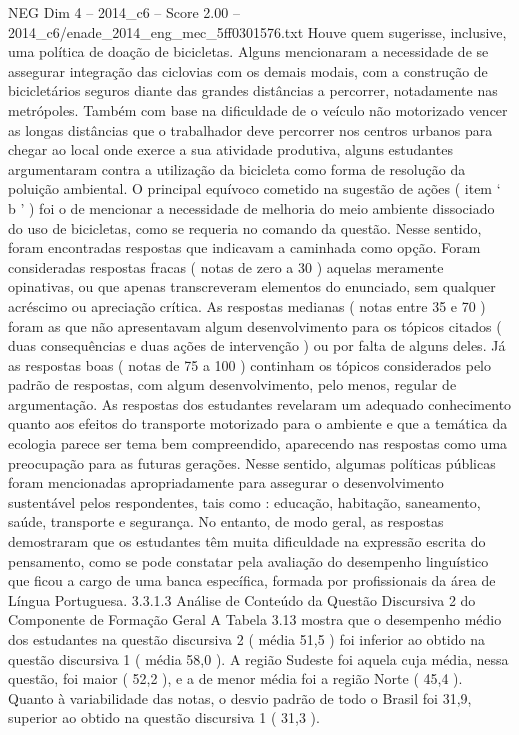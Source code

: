 \begin{textsample}{NEG Dim 4 – 2014\_c6 – Score 2.00 – 2014\_c6/enade\_2014\_eng\_mec\_5ff0301576.txt}
Houve quem sugerisse, inclusive, uma política de doação de bicicletas.
Alguns mencionaram a necessidade de se assegurar integração das ciclovias com os demais modais, com a construção de bicicletários seguros diante das grandes distâncias a percorrer, notadamente nas metrópoles.
Também com base na dificuldade de o veículo não motorizado vencer as longas distâncias que o trabalhador deve percorrer nos centros urbanos para chegar ao local onde exerce a sua atividade produtiva, alguns estudantes argumentaram contra a utilização da bicicleta como forma de resolução da poluição ambiental.
O principal equívoco cometido na sugestão de ações ( item ‘ b ’ ) foi o de mencionar a necessidade de melhoria do meio ambiente dissociado do uso de bicicletas, como se requeria no comando da questão.
Nesse sentido, foram encontradas respostas que indicavam a caminhada como opção.
Foram consideradas respostas fracas ( notas de zero a 30 ) aquelas meramente opinativas, ou que apenas transcreveram elementos do enunciado, sem qualquer acréscimo ou apreciação crítica.
As respostas medianas ( notas entre 35 e 70 ) foram as que não apresentavam algum desenvolvimento para os tópicos citados ( duas consequências e duas ações de intervenção ) ou por falta de alguns deles.
Já as respostas boas ( notas de 75 a 100 ) continham os tópicos considerados pelo padrão de respostas, com algum desenvolvimento, pelo menos, regular de argumentação.
As respostas dos estudantes revelaram um adequado conhecimento quanto aos efeitos do transporte motorizado para o ambiente e que a temática da ecologia parece ser tema bem compreendido, aparecendo nas respostas como uma preocupação para as futuras gerações.
Nesse sentido, algumas políticas públicas foram mencionadas apropriadamente para assegurar o desenvolvimento sustentável pelos respondentes, tais como : educação, habitação, saneamento, saúde, transporte e segurança.
No entanto, de modo geral, as respostas demostraram que os estudantes têm muita dificuldade na expressão escrita do pensamento, como se pode constatar pela avaliação do desempenho linguístico que ficou a cargo de uma banca específica, formada por profissionais da área de Língua Portuguesa. 3.3.1.3 Análise de Conteúdo da Questão Discursiva 2 do Componente de Formação Geral A Tabela 3.13 mostra que o desempenho médio dos estudantes na questão discursiva 2 ( média 51,5 ) foi inferior ao obtido na questão discursiva 1 ( média 58,0 ).
A região Sudeste foi aquela cuja média, nessa questão, foi maior ( 52,2 ), e a de menor média foi a região Norte ( 45,4 ).
Quanto à variabilidade das notas, o desvio padrão de todo o Brasil foi 31,9, superior ao obtido na questão discursiva 1 ( 31,3 ).

\end{textsample}
